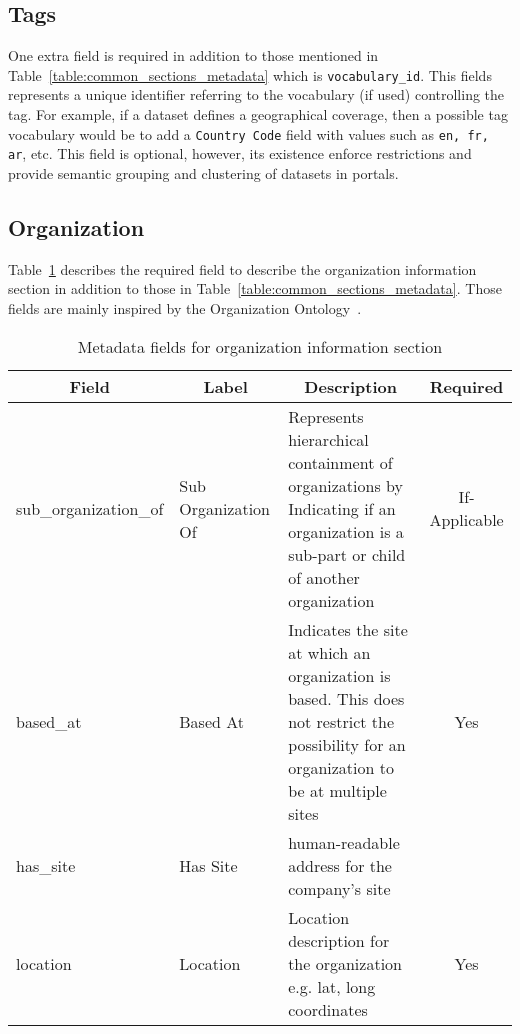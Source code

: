 \subsection{Tags}
One extra field is required in addition to those mentioned in Table~\ref{table:common_sections_metadata} which is \texttt{vocabulary\_id}. This fields represents a unique identifier referring to the vocabulary (if used) controlling the tag. For example, if a dataset defines a geographical coverage, then a possible tag vocabulary would be to add a \texttt{Country Code} field with values such as \texttt{en, fr, ar}, etc. This field is optional, however, its existence enforce restrictions and provide semantic grouping and clustering of datasets in portals.

\subsection{Organization}

Table~\ref{table:organization_metadata_fields} describes the required field to describe the organization information section in addition to those in Table~\ref{table:common_sections_metadata}. Those fields are mainly inspired by the Organization Ontology~\cite{Reynolds:W3C:14}.

\begin{table}[ht]
\centering
\begin{adjustwidth}{-.5in}{-.5in}
\small
\begin{tabular}{|l|p{2cm}|p{7cm}|c|}
\hline
\multicolumn{1}{|c|}{{\bf Field}} & \multicolumn{1}{c|}{{\bf Label}} & \multicolumn{1}{c|}{{\bf Description}}                                                                                                   & \multicolumn{1}{c|}{{\bf Required}} \\ \hline
sub\_organization\_of             & Sub Organization Of              & Represents hierarchical containment of organizations by Indicating if an organization is a sub-part or child of another organization     & If-Applicable                       \\ \hline
based\_at                         & Based At                         & Indicates the site at which an organization is based. This does not restrict the possibility for an organization to be at multiple sites & Yes                                 \\ \hline
has\_site                         & Has Site                         & human-readable address for the company's site                        &
																		\\ \hline
location                          & Location                         & Location description for the organization e.g. lat, long coordinates                                                                     & Yes                                 \\ \hline
\end{tabular}
\caption{Metadata fields for organization information section}
\label{table:organization_metadata_fields}
\end{adjustwidth}
\end{table}

